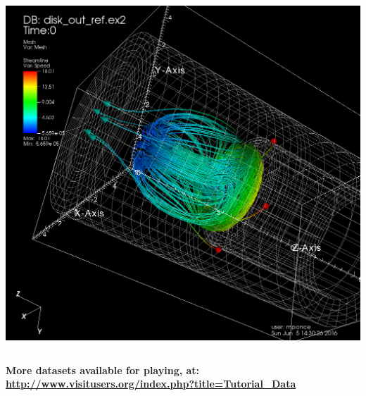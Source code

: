 \begin{frame}
\begin{columns}
\begin{column}{3cm}
	\includegraphics[width=.9\columnwidth]{figs/visit-handson/disk_out_ref-streamlines}
\end{column}
\end{columns}
\vspace{.4mm}
{\tiny\bf
More datasets available for playing, at:
\url{http://www.visitusers.org/index.php?title=Tutorial_Data}
}
\end{frame}

